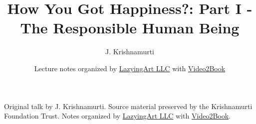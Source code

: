 \documentclass[11pt,oneside]{book}
\begin{document}
\frontmatter
\title{How You Got Happiness?: Part I - The Responsible Human Being}
\author{J. Krishnamurti}
\date{Lecture notes organized by \href{https://lazying.art}{LazyingArt LLC} with \href{https://github.com/lachlanchen/Video2Book}{Video2Book}}
\maketitle
\begin{center}
\small Original talk by J. Krishnamurti. Source material preserved by the Krishnamurti Foundation Trust. Notes organized by \href{https://lazying.art}{LazyingArt LLC} with \href{https://github.com/lachlanchen/Video2Book}{Video2Book}.
\end{center}
\clearpage
\mainmatter

\end{document}

